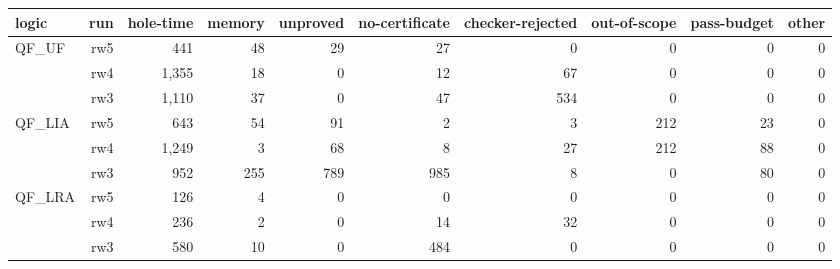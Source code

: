 \begin{tabular}{lrrrrrrrrr}
\toprule
logic & run & hole-time & memory & unproved & no-certificate & checker-rejected & out-of-scope & pass-budget & other \\
\midrule
QF\_UF & rw5 & 441 & 48 & 29 & 27 & 0 & 0 & 0 & 0 \\
 & rw4 & 1,355 & 18 & 0 & 12 & 67 & 0 & 0 & 0 \\
 & rw3 & 1,110 & 37 & 0 & 47 & 534 & 0 & 0 & 0 \\
\midrule
QF\_LIA & rw5 & 643 & 54 & 91 & 2 & 3 & 212 & 23 & 0 \\
 & rw4 & 1,249 & 3 & 68 & 8 & 27 & 212 & 88 & 0 \\
 & rw3 & 952 & 255 & 789 & 985 & 8 & 0 & 80 & 0 \\
\midrule
QF\_LRA & rw5 & 126 & 4 & 0 & 0 & 0 & 0 & 0 & 0 \\
 & rw4 & 236 & 2 & 0 & 14 & 32 & 0 & 0 & 0 \\
 & rw3 & 580 & 10 & 0 & 484 & 0 & 0 & 0 & 0 \\
\bottomrule
\end{tabular}
